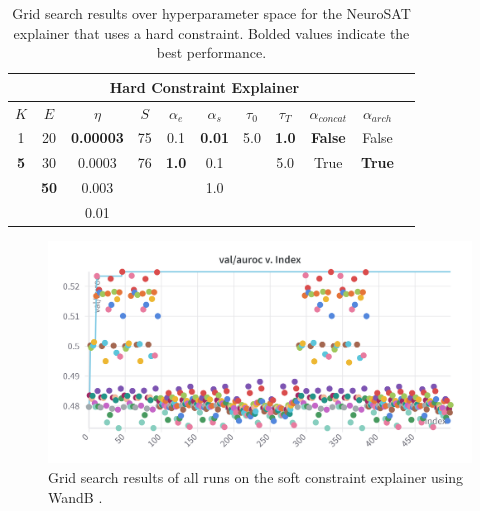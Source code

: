 \begin{table}[h]
    \centering
    \scriptsize
    \begin{tabular}{|c|c|c|c|c|c|c|c|c|c|c|}
    \hline
    \multicolumn{10}{|c|}{\textbf{Hard Constraint Explainer}} \\ \hline
    $K$ & $E$ & $\eta$ & $S$ & $\alpha_e$ & $\alpha_s$ & $\tau_0$ & $\tau_T$ & $\alpha_{concat}$ & $\alpha_{arch}$ \\ \hline
    1 & 20 & \textbf{0.00003} & 75 & 0.1 & \textbf{0.01} & 5.0 & \textbf{1.0} & \textbf{False} & False \\
    \textbf{5} & 30 & 0.0003 & 76 & \textbf{1.0} & 0.1 &  & 5.0 & True & \textbf{True} \\
     & \textbf{50} & 0.003 &  &  & 1.0 &  &  &  & \\
     &  & 0.01 &  &  &  &  &  &  & \\ \hline
    \end{tabular}
    \caption[NeuroSAT hard constraint grid search]{Grid search results over hyperparameter space for the NeuroSAT explainer that uses a hard constraint. Bolded values indicate the best performance.}
    \label{tab:sweep_conf_hard}
\end{table}

\begin{figure}
  \includegraphics[width=\linewidth]{img/NeuroSAT-soft_sweep.png}
  \caption[Grid search results of soft constraint explainer]{Grid search results of all runs on the soft constraint explainer using WandB \cite{wandb}.}
  \label{fig:soft-sweep}
\end{figure}

